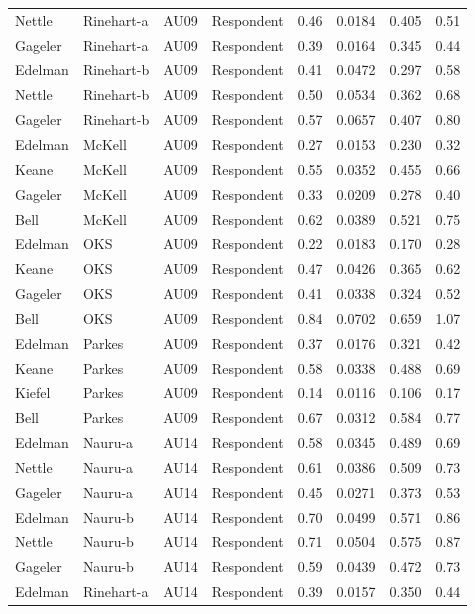 \documentclass{monashthesis}
\begin{document}
\begin{center}
\begin{longtable}{llllllll}
Nettle & Rinehart-a & AU09 & Respondent & 0.46 & 0.0184 & 0.405 & 0.51 \\
Gageler & Rinehart-a & AU09 & Respondent & 0.39 & 0.0164 & 0.345 & 0.44 \\
Edelman & Rinehart-b & AU09 & Respondent & 0.41 & 0.0472 & 0.297 & 0.58 \\
Nettle & Rinehart-b & AU09 & Respondent & 0.50 & 0.0534 & 0.362 & 0.68 \\
Gageler & Rinehart-b & AU09 & Respondent & 0.57 & 0.0657 & 0.407 & 0.80 \\
Edelman & McKell & AU09 & Respondent & 0.27 & 0.0153 & 0.230 & 0.32 \\
Keane & McKell & AU09 & Respondent & 0.55 & 0.0352 & 0.455 & 0.66 \\
Gageler & McKell & AU09 & Respondent & 0.33 & 0.0209 & 0.278 & 0.40 \\
Bell & McKell & AU09 & Respondent & 0.62 & 0.0389 & 0.521 & 0.75 \\
Edelman & OKS & AU09 & Respondent & 0.22 & 0.0183 & 0.170 & 0.28 \\
Keane & OKS & AU09 & Respondent & 0.47 & 0.0426 & 0.365 & 0.62 \\
Gageler & OKS & AU09 & Respondent & 0.41 & 0.0338 & 0.324 & 0.52 \\
Bell & OKS & AU09 & Respondent & 0.84 & 0.0702 & 0.659 & 1.07 \\
Edelman & Parkes & AU09 & Respondent & 0.37 & 0.0176 & 0.321 & 0.42 \\
Keane & Parkes & AU09 & Respondent & 0.58 & 0.0338 & 0.488 & 0.69 \\
Kiefel & Parkes & AU09 & Respondent & 0.14 & 0.0116 & 0.106 & 0.17 \\
Bell & Parkes & AU09 & Respondent & 0.67 & 0.0312 & 0.584 & 0.77 \\
Edelman & Nauru-a & AU14 & Respondent & 0.58 & 0.0345 & 0.489 & 0.69 \\
Nettle & Nauru-a & AU14 & Respondent & 0.61 & 0.0386 & 0.509 & 0.73 \\
Gageler & Nauru-a & AU14 & Respondent & 0.45 & 0.0271 & 0.373 & 0.53 \\
Edelman & Nauru-b & AU14 & Respondent & 0.70 & 0.0499 & 0.571 & 0.86 \\
Nettle & Nauru-b & AU14 & Respondent & 0.71 & 0.0504 & 0.575 & 0.87 \\
Gageler & Nauru-b & AU14 & Respondent & 0.59 & 0.0439 & 0.472 & 0.73 \\
Edelman & Rinehart-a & AU14 & Respondent & 0.39 & 0.0157 & 0.350 & 0.44 \\

\end{longtable}
\end{center}
\end{document}
